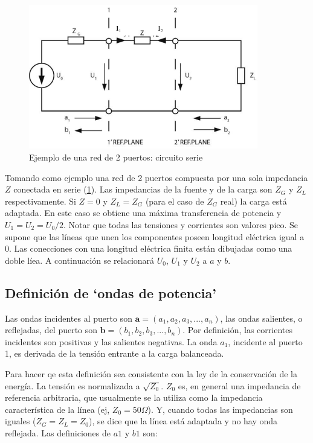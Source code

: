 \begin{figure}[H]
 \centering
 \includegraphics[width=10cm]{gfx/sParameters1.png}
 \caption{Ejemplo de una red de 2 puertos: circuito serie}
 \label{fig:esquema_serie}
\end{figure}

Tomando como ejemplo una red de 2 puertos compuesta por una sola impedancia $Z$ conectada en serie (\ref{fig:esquema_serie}).
Las impedancias de la fuente y de la carga son $Z_G$ y $Z_L$ respectivamente. Si $Z=0$ y $Z_L = Z_G$ (para el caso de $Z_G$ real)
la carga está adaptada. En este caso se obtiene una máxima transferencia de potencia y $U_1 = U_2 = U_0/2$. Notar que todas las
tensiones y corrientes son valores pico. Se supone que las líneas que unen los componentes poseen longitud eléctrica igual a 0.
Las conecciones con una longitud eléctrica finita están dibujadas como una doble líea. A continuación se relacionará $U_0$, $U_1$
y $U_2$ a $a$ y $b$.


\subsection{Definición de \enquote*{ondas de potencia}}

Las ondas incidentes al puerto son $\textbf{a}=(a_1, a_2, a_3, ..., a_n)$, las ondas salientes, o reflejadas, del puerto son
$\textbf{b}=(b_1, b_2, b_3, ..., b_n)$. Por definición, las corrientes incidentes son positivas y las salientes negativas. La
onda $a_1$, incidente al puerto 1, es derivada de la tensión entrante a la carga balanceada.

Para hacer qe esta definición sea consistente con la ley de la conservación de la energía. La tensión es normalizada a $\sqrt{Z_0}$.
$Z_0$ es, en general una impedancia de referencia arbitraria, que usualmente se la utiliza como la impedancia característica de la
línea (ej, $Z_0 = 50 \Omega$). Y, cuando todas las impedancias son iguales ($Z_G = Z_L = Z_0$), se dice que la línea está adaptada
y no hay onda reflejada. Las definiciones de $a1$ y $b1$ son:

